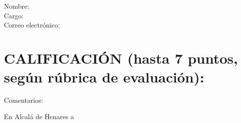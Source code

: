 \ifthenelse{\equal{\myCoTutorFullName}{}}
{
}
{
\section*{\MakeUppercase{\wordCoDirectorOrCoDirectora}}

\begin{description}
  \item[Nombre:] \myCoTutorFullName
  \item[Cargo:] \myCoTutorPosition
  \item[Correo electrónico:] \myCoTutorEmail
\end{description}
}

\section*{CALIFICACIÓN (hasta 7 puntos, según rúbrica de evaluación):}

\begin{description}
  \item[Comentarios:] %
\end{description}
\vspace{5cm}

\noindent En Alcalá de Henares a \myThesisDefenseDate

